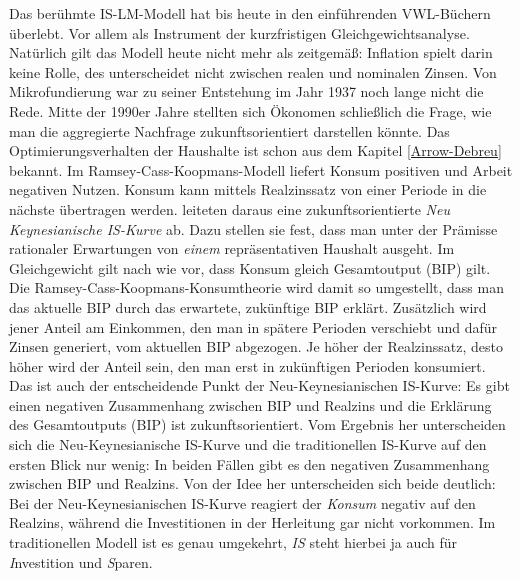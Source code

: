 Das berühmte IS-LM-Modell hat bis heute in den einführenden VWL-Büchern überlebt. Vor allem als Instrument der kurzfristigen Gleichgewichtsanalyse. Natürlich gilt das Modell heute nicht mehr als zeitgemäß: Inflation spielt darin keine Rolle, des unterscheidet nicht zwischen realen und nominalen Zinsen. Von Mikrofundierung war zu seiner Entstehung im Jahr 1937 noch lange nicht die Rede. Mitte der 1990er Jahre stellten sich Ökonomen schließlich die Frage, wie man die aggregierte Nachfrage zukunftsorientiert darstellen könnte. Das Optimierungsverhalten der Haushalte ist schon aus dem Kapitel \ref{Arrow-Debreu} bekannt. Im Ramsey-Cass-Koopmans-Modell liefert Konsum positiven und Arbeit negativen Nutzen. Konsum kann mittels Realzinssatz von einer Periode in die nächste übertragen werden. \textcite{Kerr, McCallum1999} leiteten daraus eine zukunftsorientierte \textit{Neu Keynesianische IS-Kurve} ab. Dazu stellen sie fest, dass man unter der Prämisse rationaler Erwartungen von \textit{einem} repräsentativen Haushalt ausgeht. Im Gleichgewicht gilt nach wie vor, dass Konsum gleich Gesamtoutput (BIP) gilt. Die Ramsey-Cass-Koopmans-Konsumtheorie wird damit so umgestellt, dass man das aktuelle BIP durch das erwartete, zukünftige BIP erklärt. Zusätzlich wird jener Anteil am Einkommen, den man in spätere Perioden verschiebt und dafür Zinsen generiert, vom aktuellen BIP abgezogen. Je höher der Realzinssatz, desto höher wird der Anteil sein, den man erst in zukünftigen Perioden konsumiert. Das ist auch der entscheidende Punkt der Neu-Keynesianischen IS-Kurve: Es gibt einen negativen Zusammenhang zwischen BIP und Realzins und die Erklärung des Gesamtoutputs (BIP) ist zukunftsorientiert. Vom Ergebnis her unterscheiden sich die Neu-Keynesianische IS-Kurve und die traditionellen IS-Kurve auf den ersten Blick nur wenig: In beiden Fällen gibt es den negativen Zusammenhang zwischen BIP und Realzins. Von der Idee her \parencite[S. 241]{Romer2019} unterscheiden sich beide deutlich: Bei der Neu-Keynesianischen IS-Kurve reagiert der \textit{Konsum} negativ auf den Realzins, während die Investitionen in der Herleitung gar nicht vorkommen. Im traditionellen Modell ist es genau umgekehrt, \textit{IS} steht hierbei ja auch für \textit{I}nvestition und \textit{S}paren. 
